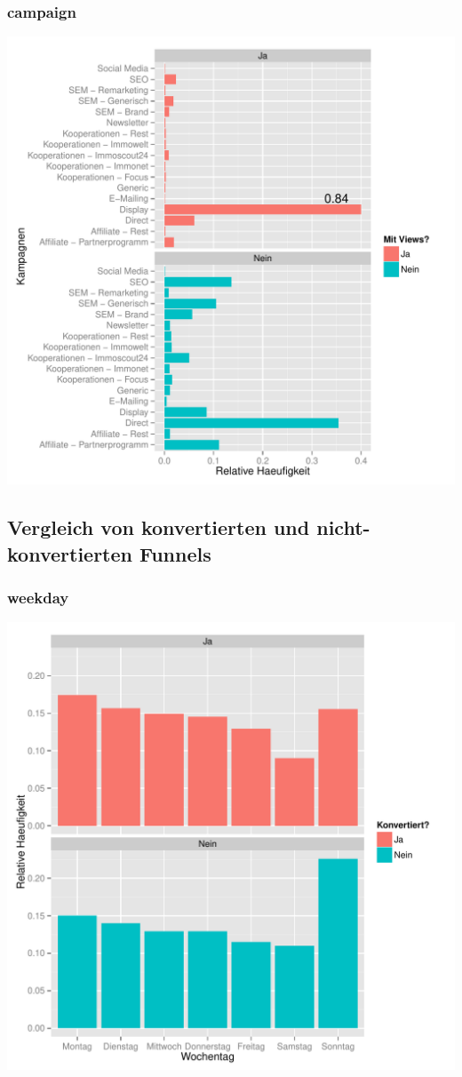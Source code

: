 \begin{frame}\frametitle{campaign}
	    \centering\includegraphics[scale=0.3]{campaignSucc.pdf}
\end{frame}

\subsection{Vergleich von konvertierten und nicht-konvertierten Funnels}

\begin{frame}\frametitle{weekday}
	    \centering\includegraphics[scale=0.3]{weekday.pdf}
\end{frame}

